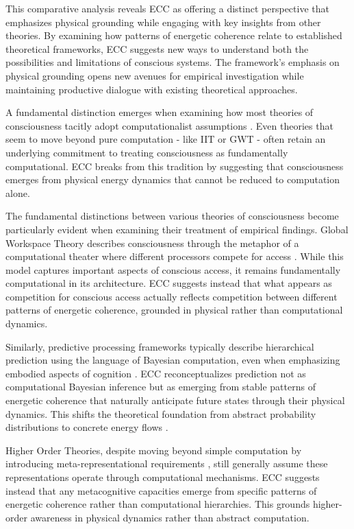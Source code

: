 \begin{refsection}
This comparative analysis reveals ECC as offering a distinct perspective that emphasizes physical grounding while engaging with key insights from other theories. By examining how patterns of energetic coherence relate to established theoretical frameworks, ECC suggests new ways to understand both the possibilities and limitations of conscious systems. The framework's emphasis on physical grounding opens new avenues for empirical investigation while maintaining productive dialogue with existing theoretical approaches.

A fundamental distinction emerges when examining how most theories of consciousness tacitly adopt computationalist assumptions \cite{Chalmers2018}. Even theories that seem to move beyond pure computation - like IIT or GWT - often retain an underlying commitment to treating consciousness as fundamentally computational. ECC breaks from this tradition by suggesting that consciousness emerges from physical energy dynamics that cannot be reduced to computation alone.

The fundamental distinctions between various theories of consciousness become particularly evident when examining their treatment of empirical findings. Global Workspace Theory describes consciousness through the metaphor of a computational theater where different processors compete for access \cite{Baars2019}. While this model captures important aspects of conscious access, it remains fundamentally computational in its architecture. ECC suggests instead that what appears as competition for conscious access actually reflects competition between different patterns of energetic coherence, grounded in physical rather than computational dynamics.

Similarly, predictive processing frameworks typically describe hierarchical prediction using the language of Bayesian computation, even when emphasizing embodied aspects of cognition \cite{Clark2019}. ECC reconceptualizes prediction not as computational Bayesian inference but as emerging from stable patterns of energetic coherence that naturally anticipate future states through their physical dynamics. This shifts the theoretical foundation from abstract probability distributions to concrete energy flows \cite{Friston2020}.

Higher Order Theories, despite moving beyond simple computation by introducing meta-representational requirements \cite{Block2020}, still generally assume these representations operate through computational mechanisms. ECC suggests instead that any metacognitive capacities emerge from specific patterns of energetic coherence rather than computational hierarchies. This grounds higher-order awareness in physical dynamics rather than abstract computation.


\end{refsection}
